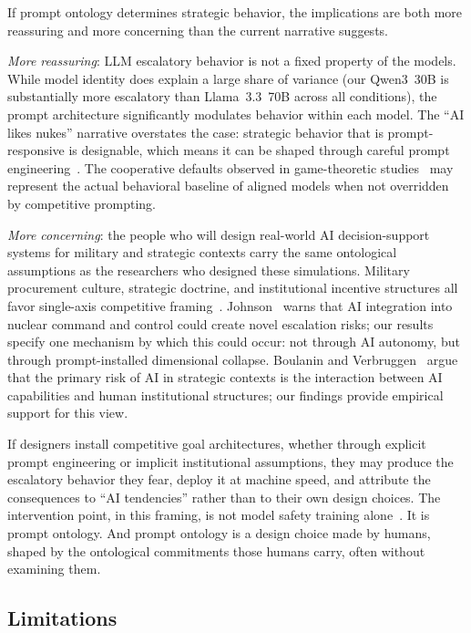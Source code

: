 \documentclass[manuscript, review=true, anonymous=true]{acmart}
\begin{document}
If prompt ontology determines strategic behavior, the implications are both more reassuring and more concerning than the current narrative suggests.

\emph{More reassuring}: LLM escalatory behavior is not a fixed property of the models.
While model identity does explain a large share of variance (our Qwen3~30B is substantially more escalatory than Llama~3.3~70B across all conditions), the prompt architecture significantly modulates behavior within each model.
The ``AI likes nukes'' narrative overstates the case: strategic behavior that is prompt-responsive is designable, which means it can be shaped through careful prompt engineering~\cite{reynolds2021prompt}.
The cooperative defaults observed in game-theoretic studies~\cite{akata2025playing,sun2025game} may represent the actual behavioral baseline of aligned models when not overridden by competitive prompting.

\emph{More concerning}: the people who will design real-world AI decision-support systems for military and strategic contexts carry the same ontological assumptions as the researchers who designed these simulations.
Military procurement culture, strategic doctrine, and institutional incentive structures all favor single-axis competitive framing~\cite{scharre2018army,horowitz2019speed}.
Johnson~\cite{johnson2020ai} warns that AI integration into nuclear command and control could create novel escalation risks; our results specify one mechanism by which this could occur: not through AI autonomy, but through prompt-installed dimensional collapse.
Boulanin and Verbruggen~\cite{boulanin2020sipri} argue that the primary risk of AI in strategic contexts is the interaction between AI capabilities and human institutional structures; our findings provide empirical support for this view.

If designers install competitive goal architectures, whether through explicit prompt engineering or implicit institutional assumptions, they may produce the escalatory behavior they fear, deploy it at machine speed, and attribute the consequences to ``AI tendencies'' rather than to their own design choices.
The intervention point, in this framing, is not model safety training alone~\cite{dafoe2018ai}.
It is prompt ontology.
And prompt ontology is a design choice made by humans, shaped by the ontological commitments those humans carry, often without examining them.

\subsection{Limitations}
\end{document}
